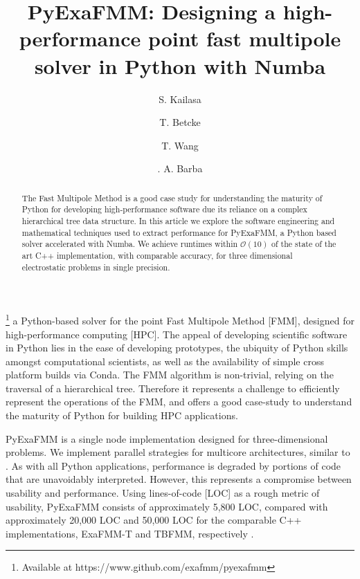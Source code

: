 \documentclass{IEEEcsmag}
\begin{document}

\title{PyExaFMM: Designing a high-performance point fast multipole solver in Python with Numba}

\author{S. Kailasa}

\author{T. Betcke}

\author{T. Wang}

\author{. A. Barba}


\begin{abstract}
The Fast Multipole Method is a good case study for understanding the maturity of Python for developing high-performance software due its reliance on a complex hierarchical tree data structure. In this article we explore the software engineering and mathematical techniques used to extract performance for PyExaFMM, a Python based solver accelerated with Numba. We achieve runtimes within $\mathcal{O}(10)$ of the state of the art C++ implementation, with comparable accuracy, for three dimensional electrostatic problems in single precision.
\end{abstract}

\maketitle
{}\footnote{Available at https://www.github.com/exafmm/pyexafmm} a Python-based solver for the point Fast Multipole Method [FMM], designed for high-performance computing [HPC]. The appeal of developing scientific software in Python lies in the ease of developing prototypes, the ubiquity of Python skills amongst computational scientists, as well as the availability of simple cross platform builds via Conda. The FMM algorithm is non-trivial, relying on the traversal of a hierarchical tree. Therefore it represents a challenge to efficiently represent the operations of the FMM, and offers a good case-study to understand the maturity of Python for building HPC applications.


PyExaFMM is a single node implementation designed for three-dimensional problems. We implement parallel strategies for multicore architectures, similar to \cite{Bramas2020, Wang2021}. As with all Python applications, performance is degraded by portions of code that are unavoidably interpreted. However, this represents a compromise between usability and performance. Using lines-of-code [LOC] as a rough metric of usability, PyExaFMM consists of approximately 5,800 LOC, compared with approximately 20,000 LOC and 50,000 LOC for the comparable C++ implementations, ExaFMM-T and TBFMM, respectively \cite{Bramas2020, Wang2021}.
\end{document}
